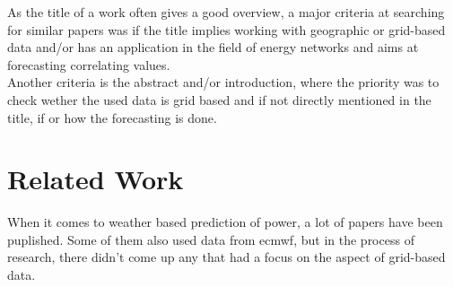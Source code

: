 As the title of a work often gives a good overview, a major criteria at searching for similar papers was if the title implies working with geographic or grid-based data and/or has an application in the field of energy networks and aims at forecasting correlating values.\\
Another criteria is the abstract and/or introduction, where the priority was to check wether the used data is grid based and if not directly mentioned in the title, if or how the forecasting is done.\\

\section{Related Work}
\label{sec:rw}

When it comes to weather based prediction of power, a lot of papers have been puplished. Some of them also used data from \gls{ecmwf}, but in the process of research, there didn't come up any that had a focus on the aspect of grid-based data.\\

